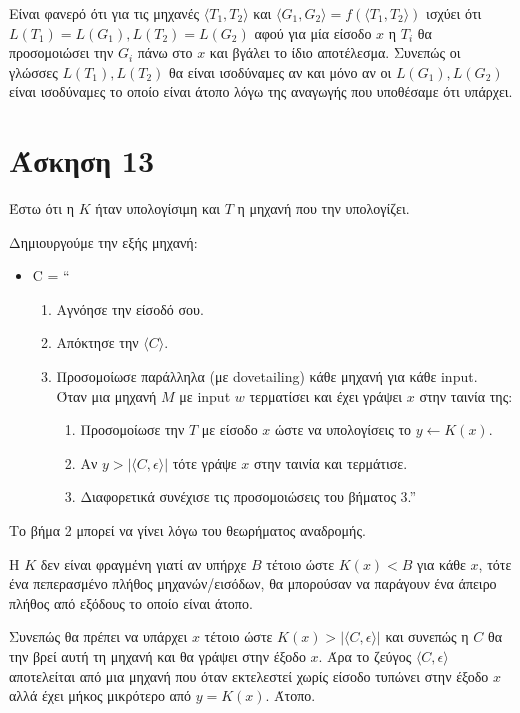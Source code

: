 \documentclass[a4paper, oneside, 11pt]{article}
\theoremstyle{definition}
\begin{document}
Είναι φανερό ότι για τις μηχανές $\langle T_1, T_2 \rangle$ και $\langle G_1,
G_2 \rangle = f(\langle T_1, T_2 \rangle)$ ισχύει ότι $L(T_1) = L(G_1), L(T_2) =
L(G_2)$ αφού για μία είσοδο $x$ η $T_i$ θα προσομοιώσει την $G_i$ πάνω στο $x$
και βγάλει το ίδιο αποτέλεσμα. Συνεπώς οι γλώσσες $L(T_1), L(T_2)$ θα είναι
ισοδύναμες αν και μόνο αν οι $L(G_1), L(G_2)$ είναι ισοδύναμες το οποίο είναι
άτοπο λόγω της αναγωγής που υποθέσαμε ότι υπάρχει.

\section*{Άσκηση 13}
Έστω ότι η $K$ ήταν υπολογίσιμη και $T$ η μηχανή που την υπολογίζει.

Δημιουργούμε την εξής μηχανή:

\begin{itemize}
\item C = ``
\begin{enumerate}
\item Αγνόησε την είσοδό σου.
\item Απόκτησε την $\langle C \rangle$.
\item Προσομοίωσε παράλληλα (με dovetailing) κάθε μηχανή για κάθε input.\\
Όταν μια μηχανή $M$ με input $w$ τερματίσει και έχει γράψει $x$ στην ταινία της:
\begin{enumerate}
\item Προσομοίωσε την $T$ με είσοδο $x$ ώστε να υπολογίσεις το $y \leftarrow
K(x)$.
\item Αν $y > |\langle C, \epsilon \rangle|$ τότε γράψε $x$ στην ταινία και τερμάτισε.
\item Διαφορετικά συνέχισε τις προσομοιώσεις του βήματος 3.''
\end{enumerate}
\end{enumerate}
\end{itemize}

Το βήμα 2 μπορεί να γίνει λόγω του θεωρήματος αναδρομής.

Η $K$ δεν είναι φραγμένη γιατί αν υπήρχε $B$ τέτοιο ώστε $K(x) < B$ για κάθε
$x$, τότε ένα πεπερασμένο πλήθος μηχανών/εισόδων, θα μπορούσαν να παράγουν ένα
άπειρο πλήθος από εξόδους το οποίο είναι άτοπο.

Συνεπώς θα πρέπει να υπάρχει $x$ τέτοιο ώστε $K(x) > |\langle C, \epsilon
\rangle|$ και συνεπώς η $C$ θα την βρεί αυτή τη μηχανή και θα γράψει στην έξοδο
$x$. Άρα το ζεύγος $\langle C, \epsilon \rangle$ αποτελείται από μια μηχανή που
όταν εκτελεστεί χωρίς είσοδο τυπώνει στην έξοδο $x$ αλλά έχει μήκος μικρότερο
από $y = K(x)$. Άτοπο.
\end{document}
